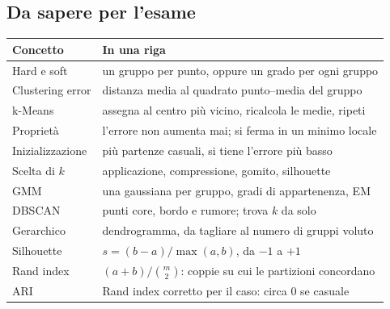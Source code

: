 \subsection{Da sapere per l'esame}
\begin{center}
    \begin{tabular}{l|l}
        \textbf{Concetto} & \textbf{In una riga} \\ \hline
        Hard e soft       & un gruppo per punto, oppure un grado per ogni gruppo \\ \hline
        Clustering error  & distanza media al quadrato punto--media del gruppo \\ \hline
        k-Means           & assegna al centro più vicino, ricalcola le medie, ripeti \\ \hline
        Proprietà         & l'errore non aumenta mai; si ferma in un minimo locale \\ \hline
        Inizializzazione  & più partenze casuali, si tiene l'errore più basso \\ \hline
        Scelta di $k$     & applicazione, compressione, gomito, silhouette \\ \hline
        GMM               & una gaussiana per gruppo, gradi di appartenenza, EM \\ \hline
        DBSCAN            & punti core, bordo e rumore; trova $k$ da solo \\ \hline
        Gerarchico        & dendrogramma, da tagliare al numero di gruppi voluto \\ \hline
        Silhouette        & $s = (b-a)/\max(a,b)$, da $-1$ a $+1$ \\ \hline
        Rand index        & $(a+b)/\binom{m}{2}$: coppie su cui le partizioni concordano \\ \hline
        ARI               & Rand index corretto per il caso: circa 0 se casuale \\
    \end{tabular}
\end{center}
